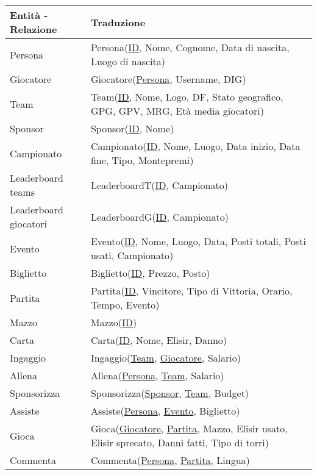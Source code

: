 \documentclass{article}
\begin{document}
\begin{table}
    \centering
    \begin{tabularx}{\textwidth}{|l|X|}
        \hline
        \textbf{Entità - Relazione} & \textbf{Traduzione} \\ \hline
        Persona & Persona(\underline{ID}, Nome, Cognome, Data di nascita, Luogo di nascita) \\ \hline
        Giocatore & Giocatore(\underline{Persona}, Username, DIG) \\ \hline
        Team & Team(\underline{ID}, Nome, Logo, DF, Stato geografico, GPG, GPV, MRG, Età media giocatori) \\ \hline
        Sponsor & Sponsor(\underline{ID}, Nome) \\ \hline
        Campionato & Campionato(\underline{ID}, Nome, Luogo, Data inizio, Data fine, Tipo, Montepremi) \\ \hline
        Leaderboard teams & LeaderboardT(\underline{ID}, Campionato)  \\ \hline
        Leaderboard giocatori & LeaderboardG(\underline{ID}, Campionato) \\ \hline
        Evento & Evento(\underline{ID}, Nome, Luogo, Data, Posti totali, Posti usati, Campionato) \\ \hline
        Biglietto & Biglietto(\underline{ID}, Prezzo, Posto) \\ \hline
        Partita & Partita(\underline{ID}, Vincitore, Tipo di Vittoria, Orario, Tempo, Evento) \\ \hline
        Mazzo & Mazzo(\underline{ID}) \\ \hline %
        Carta & Carta(\underline{ID}, Nome, Elisir, Danno) \\ \hline
        Ingaggio & Ingaggio(\underline{Team}, \underline{Giocatore}, Salario) \\ \hline
        Allena & Allena(\underline{Persona}, \underline{Team}, Salario) \\ \hline
        Sponsorizza & Sponsorizza(\underline{Sponsor}, \underline{Team}, Budget) \\ \hline
        Assiste & Assiste(\underline{Persona}, \underline{Evento}, Biglietto) \\ \hline
        Gioca & Gioca(\underline{Giocatore}, \underline{Partita}, Mazzo, Elisir usato, Elisir sprecato, Danni fatti, Tipo di torri) \\ \hline
        Commenta & Commenta(\underline{Persona}, \underline{Partita}, Lingua) \\ \hline

\end{tabularx}
\end{table}
\end{document}
